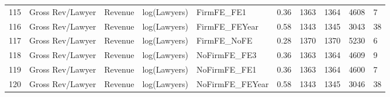 \begin{table}[ht]
\begin{tabular}{rlllllllll}
  115 & Gross Rev/Lawyer & Revenue & log(Lawyers) & FirmFE\_FE1 & 0.36 & 1363 & 1364 & 4608 & 7 \\ 
  116 & Gross Rev/Lawyer & Revenue & log(Lawyers) & FirmFE\_FEYear & 0.58 & 1343 & 1345 & 3043 & 38 \\ 
  117 & Gross Rev/Lawyer & Revenue & log(Lawyers) & FirmFE\_NoFE & 0.28 & 1370 & 1370 & 5230 & 6 \\ 
  118 & Gross Rev/Lawyer & Revenue & log(Lawyers) & NoFirmFE\_FE3 & 0.36 & 1363 & 1364 & 4609 & 9 \\ 
  119 & Gross Rev/Lawyer & Revenue & log(Lawyers) & NoFirmFE\_FE1 & 0.36 & 1363 & 1364 & 4600 & 7 \\ 
  120 & Gross Rev/Lawyer & Revenue & log(Lawyers) & NoFirmFE\_FEYear & 0.58 & 1343 & 1345 & 3046 & 38 \\ 
   \hline
\end{tabular}
\end{table}
